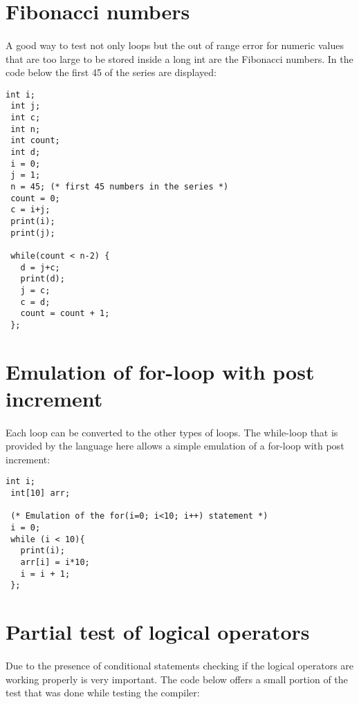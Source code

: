 	\section{Fibonacci numbers}
	\paragraph{}
	  A good way to test not only loops but the out of range error for numeric values that are too large to be stored inside a long int are the Fibonacci numbers. In the code below the first 45 of the series are displayed:
	  \begin{lstlisting}[frame=single]
 int i;
 int j;
 int c;
 int n;
 int count;
 int d;
 i = 0;
 j = 1;
 n = 45; (* first 45 numbers in the series *)
 count = 0;
 c = i+j;
 print(i);
 print(j);

 while(count < n-2) {
   d = j+c;
   print(d);
   j = c;
   c = d;
   count = count + 1;
 };
	  \end{lstlisting}
	  
	\section{Emulation of for-loop with post increment}
	\paragraph{}
		Each loop can be converted to the other types of loops. The while-loop that is provided by the language here allows a simple emulation of a for-loop with post increment:
		\begin{lstlisting}[frame=single]
 int i;
 int[10] arr;

 (* Emulation of the for(i=0; i<10; i++) statement *)
 i = 0;
 while (i < 10){
   print(i);
   arr[i] = i*10;
   i = i + 1;
 };
		\end{lstlisting}
	  
	\section{Partial test of logical operators}
	\paragraph{}
		Due to the presence of conditional statements checking if the logical operators are working properly is very important. The code below offers a small portion of the test that was done while testing the compiler:
	 	
